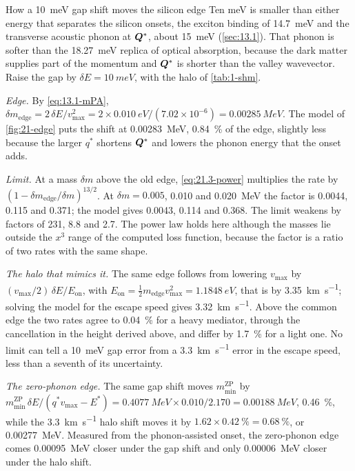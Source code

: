 \begin{workedexample}{How a \SI{10}{meV} gap shift moves the silicon edge}\label{we:21-gapshift}
Ten meV is smaller than either energy that separates the silicon onsets, the exciton binding of \SI{14.7}{meV} and the transverse acoustic phonon at $\bm{Q}^*$, about \SI{15}{meV} (\cref{sec:13.1}). That phonon is softer than the \SI{18.27}{meV} replica of optical absorption, because the dark matter supplies part of the momentum and $\bm{Q}^*$ is shorter than the valley wavevector. Raise the gap by $\delta E = \SI{10}{meV}$, with the halo of \cref{tab:1-shm}.

\emph{Edge.} By \cref{eq:13.1-mPA}, $\delta m_{\mathrm{edge}} = 2\,\delta E/v_{\mathrm{max}}^2 = 2 \times \SI{0.010}{eV}/(7.02\times10^{-6}) = \SI{0.00285}{MeV}$. The model of \cref{fig:21-edge} puts the shift at \SI{0.00283}{MeV}, \SI{0.84}{\percent} of the edge, slightly less because the larger $q^*$ shortens $\bm{Q}^*$ and lowers the phonon energy that the onset adds.

\emph{Limit.} At a mass $\delta m$ above the old edge, \cref{eq:21.3-power} multiplies the rate by $(1 - \delta m_{\mathrm{edge}}/\delta m)^{13/2}$. At $\delta m = 0.005$, 0.010 and \SI{0.020}{MeV} the factor is 0.0044, 0.115 and 0.371; the model gives 0.0043, 0.114 and 0.368. The limit weakens by factors of 231, 8.8 and 2.7. The power law holds here although the masses lie outside the $x^3$ range of the computed loss function, because the factor is a ratio of two rates with the same shape.

\emph{The halo that mimics it.} The same edge follows from lowering $v_{\mathrm{max}}$ by $(v_{\mathrm{max}}/2)\,\delta E/E_{\mathrm{on}}$, with $E_{\mathrm{on}} = \tfrac12 m_{\mathrm{edge}}v_{\mathrm{max}}^2 = \SI{1.1848}{eV}$, that is by \SI{3.35}{km.s^{-1}}; solving the model for the escape speed gives \SI{3.32}{km.s^{-1}}. Above the common edge the two rates agree to \SI{0.04}{\percent} for a heavy mediator, through the cancellation in the height derived above, and differ by \SI{1.7}{\percent} for a light one. No limit can tell a \SI{10}{meV} gap error from a \SI{3.3}{km.s^{-1}} error in the escape speed, less than a seventh of its uncertainty.

\emph{The zero-phonon edge.} The same gap shift moves $m_{\mathrm{min}}^{\mathrm{ZP}}$ by $m_{\mathrm{min}}^{\mathrm{ZP}}\,\delta E/(q^*v_{\mathrm{max}} - E^*) = \SI{0.4077}{MeV} \times 0.010/2.170 = \SI{0.00188}{MeV}$, \SI{0.46}{\percent}, while the \SI{3.3}{km.s^{-1}} halo shift moves it by $1.62 \times \SI{0.42}{\percent} = \SI{0.68}{\percent}$, or \SI{0.00277}{MeV}. Measured from the phonon-assisted onset, the zero-phonon edge comes \SI{0.00095}{MeV} closer under the gap shift and only \SI{0.00006}{MeV} closer under the halo shift.
\end{workedexample}
